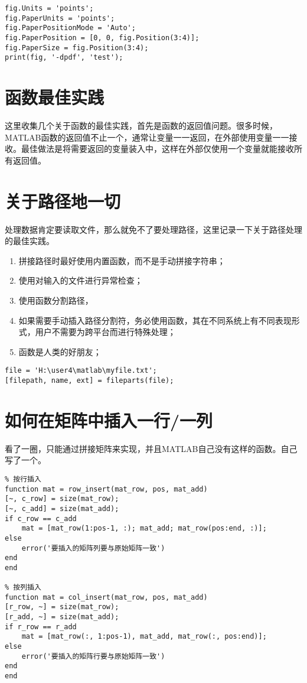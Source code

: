 \begin{verbatim}
fig.Units = 'points';
fig.PaperUnits = 'points';
fig.PaperPositionMode = 'Auto';
fig.PaperPosition = [0, 0, fig.Position(3:4)];
fig.PaperSize = fig.Position(3:4);
print(fig, '-dpdf', 'test');
\end{verbatim}

\section{函数最佳实践}

这里收集几个关于函数的最佳实践，首先是函数的返回值问题。很多时候，MATLAB函数的返回值不止一个，通常让变量一一返回，在外部使用变量一一接收。最佳做法是将需要返回的变量装入中，这样在外部仅使用一个变量就能接收所有返回值。

\section{关于路径地一切}

处理数据肯定要读取文件，那么就免不了要处理路径，这里记录一下关于路径处理的最佳实践。

\begin{enumerate}
    \item 拼接路径时最好使用内置函数，而不是手动拼接字符串；
    \item 使用对输入的文件进行异常检查；
    \item 使用函数分割路径，
    \item 如果需要手动插入路径分割符，务必使用函数，其在不同系统上有不同表现形式，用户不需要为跨平台而进行特殊处理；
    \item {}函数是人类的好朋友；
\end{enumerate}

\begin{verbatim}
file = 'H:\user4\matlab\myfile.txt';
[filepath, name, ext] = fileparts(file);
\end{verbatim}

\section{如何在矩阵中插入一行/一列}

看了一圈，只能通过拼接矩阵来实现，并且MATLAB自己没有这样的函数。自己写了一个。

\begin{verbatim}
% 按行插入
function mat = row_insert(mat_row, pos, mat_add)
[~, c_row] = size(mat_row);
[~, c_add] = size(mat_add);
if c_row == c_add
    mat = [mat_row(1:pos-1, :); mat_add; mat_row(pos:end, :)];
else
    error('要插入的矩阵列要与原始矩阵一致')
end
end

% 按列插入
function mat = col_insert(mat_row, pos, mat_add)
[r_row, ~] = size(mat_row);
[r_add, ~] = size(mat_add);
if r_row == r_add
    mat = [mat_row(:, 1:pos-1), mat_add, mat_row(:, pos:end)];
else
    error('要插入的矩阵行要与原始矩阵一致')
end
end
\end{verbatim}


